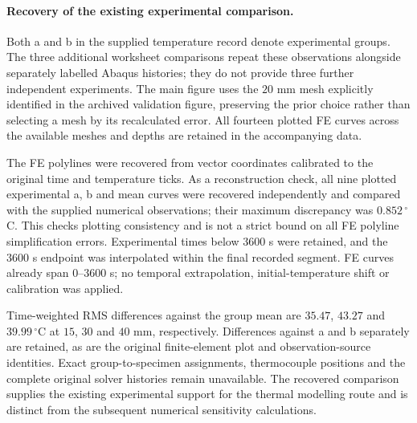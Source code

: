 \paragraph{Recovery of the existing experimental comparison.}
Both a and b in the supplied temperature record denote experimental groups. The three additional worksheet comparisons repeat these observations alongside separately labelled Abaqus histories; they do not provide three further independent experiments. The main figure uses the $20$ mm mesh explicitly identified in the archived validation figure, preserving the prior choice rather than selecting a mesh by its recalculated error. All fourteen plotted FE curves across the available meshes and depths are retained in the accompanying data.

The FE polylines were recovered from vector coordinates calibrated to the original time and temperature ticks. As a reconstruction check, all nine plotted experimental a, b and mean curves were recovered independently and compared with the supplied numerical observations; their maximum discrepancy was $0.852\,{}^\circ$C. This checks plotting consistency and is not a strict bound on all FE polyline simplification errors. Experimental times below $3600$ s were retained, and the $3600$ s endpoint was interpolated within the final recorded segment. FE curves already span $0$--$3600$ s; no temporal extrapolation, initial-temperature shift or calibration was applied.

Time-weighted RMS differences against the group mean are $35.47$, $43.27$ and $39.99\,{}^\circ$C at $15$, $30$ and $40$ mm, respectively. Differences against a and b separately are retained, as are the original finite-element plot and observation-source identities. Exact group-to-specimen assignments, thermocouple positions and the complete original solver histories remain unavailable. The recovered comparison supplies the existing experimental support for the thermal modelling route and is distinct from the subsequent numerical sensitivity calculations.
